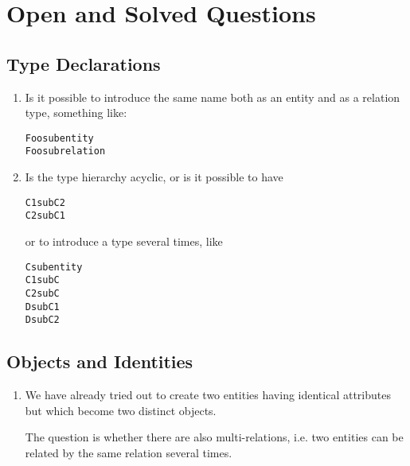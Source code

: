 \documentclass[runningheads]{llncs}
\begin{document}
\section{Open and Solved Questions}\label{sec:questions}

\subsection{Type Declarations}


\begin{enumerate}
\item Is it possible to introduce the same name both as an entity and as a
  relation type, something like:

  \begin{alltt}
    Foo sub entity
    Foo sub relation
  \end{alltt}

\item Is the type hierarchy acyclic, or is it possible to have
  \begin{alltt}
    C1 sub C2
    C2 sub C1
  \end{alltt}
  or to introduce a type several times, like
  \begin{alltt}
    C sub entity
    C1 sub C
    C2 sub C
    D sub C1
    D sub C2
  \end{alltt}
\end{enumerate}


\subsection{Objects and Identities}

\begin{enumerate}
\item We have already tried out to create two entities having identical
  attributes but which become two distinct objects.

  The question is whether there are also multi-relations, i.e. two entities
  can be related by the same relation several times.
\end{enumerate}



\end{document}
